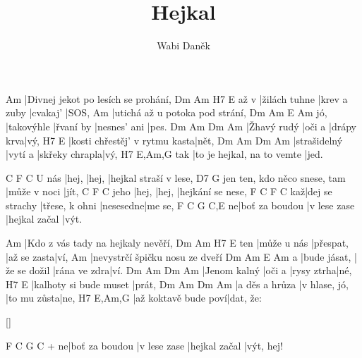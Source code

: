 \documentclass{song}
\title{Hejkal}
\author{Wabi Daněk}
\begin{document}
\strophe
Am
|Divnej jekot po lesích se prohání,
     Dm            Am           H7       E
až v |žilách tuhne |krev a zuby |cvakaj' |SOS,
Am
|utichá až u potoka pod strání,
    Dm         Am        E            Am
jó, |takovýhle |řvaní by |nesnes' ani |pes.
Dm          Am     Dm         Am
|Žhavý rudý |oči a |drápy krva|vý,
H7                            E
|kosti chřestěj' v rytmu kasta|nět,
Dm           Am      Dm             Am
|strašidelný |vytí a |skřeky chrapla|vý,
    H7                         E,Am,G
tak |to je hejkal, na to vemte |jed.
\endstrophe

      C     F     C
U nás |hej, |hej, |hejkal straší v lese,
                             D7           G
jen ten, kdo něco snese, tam |může v noci |jít,
     C     F     C
jeho |hej, |hej, |hejkání se nese,
   F               C              F         C
kaž|dej se strachy |třese, k ohni |nesesedne|me se,
  F              C            G             C,E
ne|boť za boudou |v lese zase |hejkal začal |výt.
\endstrophe

\strophe
Am
|Kdo z vás tady na hejkaly nevěří,
    Dm          Am        H7         E
ten |může u nás |přespat, |až se zasta|ví,
Am
|nevystrčí špičku nosu ze dveří
  Dm           Am           E            Am
a |bude jásat, |že se dožil |rána ve zdra|ví.
Dm           Am     Dm         Am
|Jenom kalný |oči a |rysy ztrha|né,
H7                    E
|kalhoty si bude muset |prát,
Dm             Am            Dm          Am
|a děs a hrůza |v hlase, jó, |to mu zůsta|ne,
H7                  E,Am,G
|až koktavě bude poví|dat, že:
\endstrophe

\ref{}

\strophe
    F              C            G             C
+ ne|boť za boudou |v lese zase |hejkal začal |výt, hej!
\endstrophe
\end{document}
